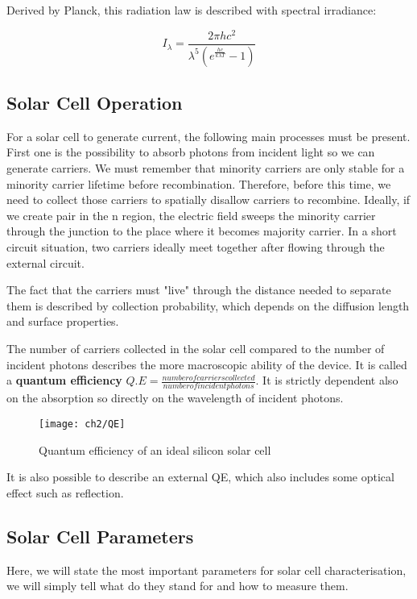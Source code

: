 Derived by Planck, this radiation law is described with spectral irradiance\cite{planck}:

\begin{equation}
I_\lambda = \frac{2\pi hc^2}{\lambda^5(e^{\frac{hc}{k\lambda T}}-1)}
\end{equation}

\subsection{Solar Cell Operation}

For a solar cell to generate current, the following main processes must be present. First one is the possibility to absorb photons from incident light so we can generate carriers. We must remember that minority carriers are only stable for a minority carrier lifetime before recombination. Therefore, before this time, we need to collect those carriers to spatially disallow carriers to recombine. Ideally, if we create pair in the n region, the electric field sweeps the minority carrier through the junction to the place where it becomes majority carrier. In a short circuit situation, two carriers ideally meet together after flowing through the external circuit. 

The fact that the carriers must "live" through the distance needed to separate them is described by collection probability, which depends on the diffusion length and surface properties. 

The number of carriers collected in the solar cell compared to the number of incident photons describes the more macroscopic ability of the device. It is called a \textbf{quantum efficiency} $Q.E=\frac{number of carriers collected}{number of incident photons}$. It is strictly dependent also on the absorption so directly on the wavelength of incident photons. 

\begin{figure}
\centering
\texttt{[image: ch2/QE]}
\caption{Quantum efficiency of an ideal silicon solar cell \cite{pv}}
\end{figure}

It is also possible to describe an external QE, which also includes some optical effect such as reflection. 

\subsection{Solar Cell Parameters}
Here, we will state the most important parameters for solar cell characterisation, we will simply tell what do they stand for and how to measure them. 

